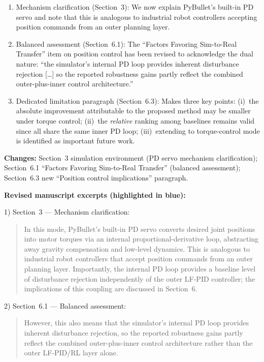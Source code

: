 \documentclass[11pt,a4paper]{article}
\begin{document}
\begin{enumerate}[leftmargin=*, label=\arabic*)]
\item Mechanism clarification (Section~3): We now explain PyBullet's built-in PD servo and note that this is analogous to industrial robot controllers accepting position commands from an outer planning layer.

\item Balanced assessment (Section~6.1): The ``Factors Favoring Sim-to-Real Transfer'' item on position control has been revised to acknowledge the dual nature: ``the simulator's internal PD loop provides inherent disturbance rejection [\ldots] so the reported robustness gains partly reflect the combined outer-plus-inner control architecture.''

\item Dedicated limitation paragraph (Section~6.3): Makes three key points: (i)~the absolute improvement attributable to the proposed method may be smaller under torque control; (ii)~the \emph{relative} ranking among baselines remains valid since all share the same inner PD loop; (iii)~extending to torque-control mode is identified as important future work.
\end{enumerate}

\textbf{Changes:} Section~3 simulation environment (PD servo mechanism clarification); Section~6.1 ``Factors Favoring Sim-to-Real Transfer'' (balanced assessment); Section~6.3 new ``Position control implications'' paragraph.

\textbf{Revised manuscript excerpts (highlighted in blue):}

1) Section~3 --- Mechanism clarification:
\begin{quote}\color{blue}\small
In this mode, PyBullet's built-in PD servo converts desired joint positions into motor torques via an internal proportional-derivative loop, abstracting away gravity compensation and low-level dynamics. This is analogous to industrial robot controllers that accept position commands from an outer planning layer. Importantly, the internal PD loop provides a baseline level of disturbance rejection independently of the outer LF-PID controller; the implications of this coupling are discussed in Section~6.
\end{quote}

2) Section~6.1 --- Balanced assessment:
\begin{quote}\color{blue}\small
However, this also means that the simulator's internal PD loop provides inherent disturbance rejection, so the reported robustness gains partly reflect the combined outer-plus-inner control architecture rather than the outer LF-PID/RL layer alone.
\end{quote}
\end{document}
